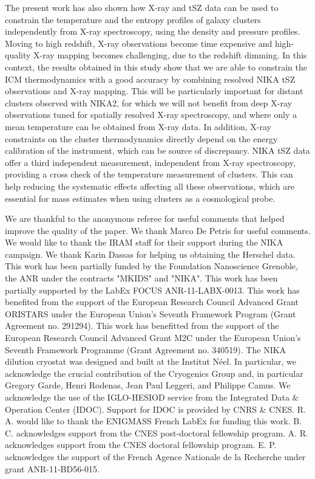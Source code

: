 \documentclass[twocolumn,traditabstract]{aa}
\begin{document}
The present work has also shown how X-ray and tSZ data can be used to constrain the temperature and the entropy profiles of galaxy clusters independently from X-ray spectroscopy, using the density and pressure profiles. Moving to high redshift, X-ray observations become time expensive and high-quality X-ray mapping becomes challenging, due to the redshift dimming. In this context, the results obtained in this study show that we are able to constrain the ICM thermodynamics with a good accuracy by combining resolved NIKA tSZ observations and X-ray mapping. This will be particularly important for distant clusters observed with NIKA2, for which we will not benefit from deep X-ray observations tuned for spatially resolved X-ray spectroscopy, and where only a mean temperature can be obtained from X-ray data. In addition, X-ray constraints on the cluster thermodynamics directly depend on the energy calibration of the instrument, which can be source of discrepancy. NIKA tSZ data offer a third independent measurement, independent from X-ray spectroscopy, providing a cross check of the temperature measurement of clusters. This can help reducing the systematic effects affecting all these observations, which are essential for mass estimates when using clusters as a cosmological probe.

\begin{acknowledgements}
We are thankful to the anonymous referee for useful comments that helped improve the quality of the paper.
We thank Marco De Petris for useful comments.
We would like to thank the IRAM staff for their support during the NIKA campaign.
We thank Karin Dassas for helping us obtaining the Herschel data.
This work has been partially funded by the Foundation Nanoscience Grenoble, the ANR under the contracts "MKIDS" and "NIKA". 
This work has been partially supported by the LabEx FOCUS ANR-11-LABX-0013. 
This work has benefited from the support of the European Research Council Advanced Grant ORISTARS under the European Union's Seventh Framework Program (Grant Agreement no. 291294).
This work has benefitted from the support of the European Research Council Advanced Grant M2C under the European Union’s Seventh Framework Programme (Grant Agreement no. 340519).
The NIKA dilution cryostat was designed and built at the Institut N\'eel. In particular, we acknowledge the crucial contribution of the Cryogenics Group and, in particular Gregory Garde, Henri Rodenas, Jean Paul Leggeri, and Philippe Camus. 
We acknowledge the use of the IGLO-HESIOD service from the Integrated Data \& Operation Center (IDOC). Support for IDOC is provided by CNRS \& CNES. 
R. A. would like to thank the ENIGMASS French LabEx for funding this work. 
B. C. acknowledges support from the CNES post-doctoral fellowship program. 
A. R. acknowledges support from the CNES doctoral fellowship program. 
E. P. acknowledges the support of the French Agence Nationale de la Recherche under grant ANR-11-BD56-015.
\end{acknowledgements}


\end{document}

